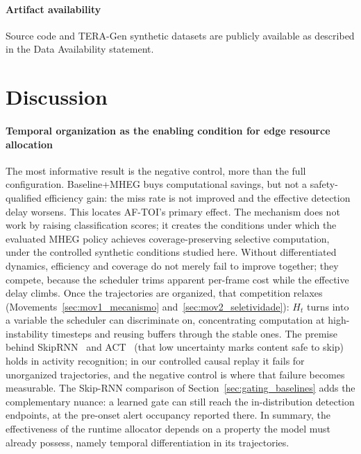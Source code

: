 \documentclass[a4paper,fleqn]{cas-dc}
\newcommand{\TERAGen}{\mbox{TERA-Gen}\xspace}
\newcommand{\AFTOI}{\mbox{AF-TOI}\xspace}
\newcommand{\MHEG}{\mbox{MHEG}\xspace}
\begin{document}
\paragraph{Artifact availability}
Source code and \TERAGen synthetic datasets are publicly available as
described in the Data Availability statement.
\section{Discussion}
\label{sec:discussao}
\paragraph{Temporal organization as the enabling condition for edge resource allocation}
The most informative result is the negative control, more than the full
configuration. {\color{\revcolor}Baseline+MHEG buys computational
savings, but not a safety-qualified efficiency gain: the miss rate is not
improved and the effective detection delay worsens.} This locates \AFTOI's
primary effect. The mechanism does not work by raising classification scores;
{\color{\revcolor}it creates the conditions under which the evaluated \MHEG
policy achieves coverage-preserving selective computation, under the
controlled synthetic conditions studied here.} Without differentiated dynamics, efficiency and
coverage do not merely fail to improve together; they compete, because the
scheduler trims apparent per-frame cost while the effective delay climbs. Once the
trajectories are organized, that competition relaxes
(Movements~\ref{sec:mov1_mecanismo} and~\ref{sec:mov2_seletividade}): $H_t$ turns
into a variable the scheduler can discriminate on, concentrating computation at
high-instability timesteps and reusing buffers through the stable ones. The premise
behind SkipRNN~\cite{campos2018skip} and ACT~\cite{graves2016adaptive} (that low
uncertainty marks content safe to skip) holds in activity recognition; in our
controlled causal replay it fails for unorganized trajectories, and the
negative control is where that failure becomes measurable. The Skip-RNN
comparison of Section~\ref{sec:gating_baselines} adds the complementary
nuance: a learned gate can still reach the in-distribution detection
endpoints, at the pre-onset alert occupancy reported there. In summary, the effectiveness of the runtime allocator depends on a property the model must already possess, namely temporal differentiation in its trajectories.
\end{document}
